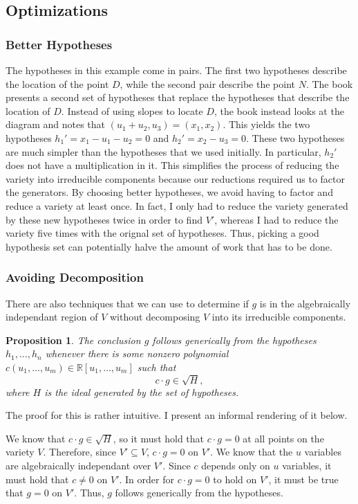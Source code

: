 \documentclass[12pt]{article}
\theoremstyle{plain}
\newtheorem{Proposition}[Theorem]{Proposition}
\theoremstyle{definition}
\theoremstyle{remark}
\begin{document}
\subsection{Optimizations}
\subsubsection{Better Hypotheses}
The hypotheses in this example come in pairs. The first two hypotheses describe the location of the point $D$, while the second pair describe the point $N$.
The book presents a second set of hypotheses that replace the hypotheses that describe the location of $D$.
Instead of using slopes to locate $D$, the book instead looks at the diagram and notes that $(u_1 + u_2,u_3) = (x_1,x_2)$. 
This yields the two hypotheses $h_1'= x_1 - u_1 - u_2 = 0$ and $h_2'= x_2-u_3 = 0$. These two hypotheses are much simpler than the hypotheses that we used initially.
In particular, $h_2'$ does not have a multiplication in it. 
This simplifies the process of reducing the variety into irreducible components because our reductions required us to factor the generators.
By choosing better hypotheses, we avoid having to factor and reduce a variety at least once. 
In fact, I only had to reduce the variety generated by these new hypotheses twice in order to find $V'$, whereas I had to reduce the variety five times with the orignal set of hypotheses.
Thus, picking a good hypothesis set can potentially halve the amount of work that has to be done.
\subsubsection{Avoiding Decomposition}
There are also techniques that we can use to determine if $g$ is in the algebraically independant region of $V$ without decomposing $V$ into its irreducible components.
\begin{Proposition}
    The conclusion $g$ follows generically from the hypotheses $h_1,\dots,h_n$ whenever there is some nonzero polynomial $c(u_1,\dots,u_m) \in \mathbb{R}[u_1,\dots,u_m]$ such that
    $$c \cdot g \in \sqrt{H},$$
    where $H$ is the ideal generated by the set of hypotheses.
\end{Proposition}
The proof for this is rather intuitive. I present an informal rendering of it below.

We know that $c \cdot g \in \sqrt{H}$, so it must hold that $c\cdot g = 0$ at all points on the variety $V$.
Therefore, since $V' \subseteq V$, $c \cdot g = 0$ on $V'$.
We know that the $u$ variables are algebraically independant over $V'$. Since $c$ depends only on $u$ variables, it must hold that $c \not = 0$ on $V'$.
In order for $c \cdot g = 0$ to hold on $V'$, it must be true that $g = 0$ on $V'$. Thus, $g$ follows generically from the hypotheses.
\end{document}
